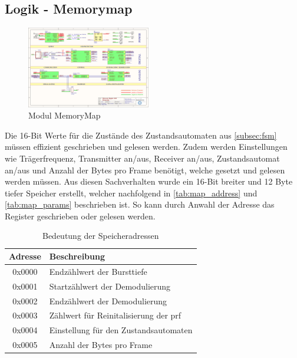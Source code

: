 \subsection{Logik - Memorymap}\label{subsec:cpld_register}
\begin{figure}[!h]
	\centering
	\includegraphics[page=11,width=0.48\textwidth, trim=111mm 118mm 127mm 43mm, clip=true]{images/pcb/new.PDF}
	\caption{Modul MemoryMap}
	\label{fig:layer_map}
\end{figure}
Die 16-Bit Werte für die Zustände des Zustandsautomaten aus \autoref{subsec:fsm} müssen effizient geschrieben und gelesen werden. Zudem werden Einstellungen wie Trägerfrequenz, Transmitter an/aus, Receiver an/aus, Zustandsautomat an/aus und Anzahl der Bytes pro Frame benötigt, welche gesetzt und gelesen werden müssen. Aus diesen Sachverhalten wurde ein 16-Bit breiter und 12 Byte tiefer Speicher erstellt, welcher nachfolgend in \autoref{tab:map_address} und \autoref{tab:map_params} beschrieben ist. So kann durch Anwahl der Adresse das Register geschrieben oder gelesen werden.
\newpage
\begin{table}[h]
\centering
\caption{Bedeutung der Speicheradressen}
\label{tab:map_address}
\begin{tabular}{|c|l|}
\hline 
Adresse & Beschreibung\\  \hline
0x0000 & Endzählwert der Bursttiefe\\ \hline
0x0001 & Startzählwert der Demodulierung\\ \hline
0x0002 & Endzählwert der Demodulierung\\ \hline
0x0003 & Zählwert für Reinitalisierung der \ac{prf}\\ \hline
0x0004 & Einstellung für den Zustandsautomaten\\ \hline
0x0005 & Anzahl der Bytes pro Frame\\ \hline
\end{tabular} 
\end{table}

